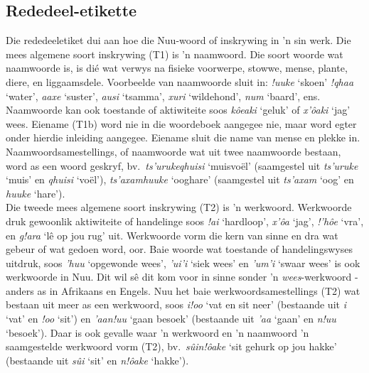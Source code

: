 \markboth{}{}
\subsection{Rededeel-etikette}
\label{s:pos_a}
\markboth{}{}

Die rededeeletiket dui aan hoe die N\textipa{\textvertline}uu-woord of
inskrywing in 'n sin werk. Die mees algemene soort inskrywing (T1) is
'n naamwoord. Die soort woorde wat naamwoorde is, is di\'{e} wat
verwys na fisieke voorwerpe, stowwe, mense, plante, diere, en
liggaamsdele. Voorbeelde van naamwoorde sluit in: \emph{!uuke} `skoen'
\emph{!qhaa} `water', \emph{\textipa{\textdoublevertline}aaxe}
`suster', \emph{\textipa{\textdoublebarpipe}ausi} `tsamma',
\emph{\textipa{\textdoublevertline}xuri} `wildehond',
\emph{n\textipa{\textvertline}um} `baard', ens.  Naamwoorde kan ook
toestande of aktiwiteite soos \emph{k\^{o}eaki} `geluk' of
\emph{\textipa{\textvertline}x'\^{o}aki} `jag' wees. Eiename (T1b)
word nie in die woordeboek aangegee nie, maar word egter onder hierdie
inleiding aangegee. Eiename sluit die name van mense en plekke in.
Naamwoordsamestellings, of naamwoorde wat uit twee naamwoorde bestaan,
word as een woord geskryf, bv.\
\emph{ts'uruke\textipa{\textvertline}qhuisi} `muisvo\"{e}l'
(saamgestel uit \emph{ts'uruke} `muis' en
\emph{\textipa{\textvertline}qhuisi} `vo\"{e}l'),
\emph{ts'axam\textipa{\textvertline}huuke} `ooghare' (saamgestel uit
\emph{ts'axam} `oog' en \emph{\textipa{\textvertline}huuke} `hare').\\

Die tweede mees algemene soort inskrywing (T2) is 'n werkwoord.
Werkwoorde druk gewoonlik aktiwiteite of handelinge soos \emph{!ai}
`hardloop', \emph{\textipa{\textvertline}x'\^{o}a} `jag',
\emph{!'h\^{o}e} `vra', en \emph{g!ara} `l\^{e} op jou rug' uit.
Werkwoorde vorm die kern van sinne en dra wat gebeur of wat gedoen
word, oor. Baie woorde wat toestande of handelingswyses uitdruk, soos
\emph{\textipa{\textdoublevertline}'huu} `opgewonde wees',
\emph{'ui'i} `siek wees' en
\emph{\textipa{\textdoublevertline}'um'i} `swaar wees' is ook
werkwoorde in N\textipa{\textvertline}uu. Dit wil s\^{e} dit kom voor
in sinne sonder 'n \emph{wees}-werkwoord - anders as in Afrikaans en Engels.
N\textipa{\textvertline}uu het baie werkwoordsamestellings (T2) wat
bestaan uit meer as een werkwoord, soos
\emph{\textipa{\textvertline}i!oo} `vat en sit neer' (bestaande uit
\emph{\textipa{\textvertline}i} `vat' en \emph{!oo} `sit') en
\emph{\textipa{\textdoublevertline}'aan!uu} `gaan besoek' (bestaande
uit \emph{\textipa{\textdoublevertline}'aa} `gaan' en \emph{n!uu}
`besoek'). Daar is ook gevalle waar 'n werkwoord en 'n naamwoord 'n
saamgestelde werkwoord vorm (T2), bv.\ \emph{s\^{u}in!\^{o}ake} `sit
gehurk op jou hakke' (bestaande uit \emph{s\^{u}i} `sit' en
\emph{n!\^{o}ake} `hakke').\\


